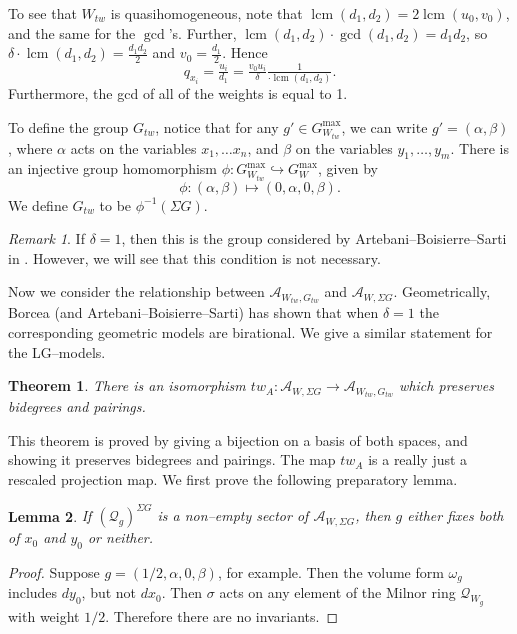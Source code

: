 \documentclass[10pt, letterpaper]{amsart}
\newtheorem{thm}{Theorem}%
\newtheorem{lem}[thm]{Lemma}
\theoremstyle{remark}
\newtheorem{rem}{Remark}[thm]
\newcommand{\sA}{\mathscr{A}}
\newcommand{\sQ}{\mathscr{Q}}
\newcommand{\tw}[1]{{#1}_{tw}}
\newcommand{\s}[1]{\Sigma #1}
\DeclareMathOperator{\lcm}{lcm}
\begin{document}
To see that $\tw{W}$ is quasihomogeneous, note that $\lcm(d_1,d_2)=2\lcm(u_0,v_0)$, and the same for the $\gcd$'s. Further,  $\lcm(d_1,d_2)\cdot\gcd(d_1,d_2)=d_1d_2$, so  $\delta\cdot\lcm(d_1,d_2)=\tfrac{d_1d_2}{2}$ and $v_0=\tfrac{d_1}{2}$. Hence
\[
q_{x_i}=\tfrac{u_i}{d_1}=\tfrac{v_0u_i}{\delta}\tfrac{1}{\cdot\lcm(d_1,d_2)}.
\]
Furthermore, the gcd of all of the weights is equal to 1. 


To define the group $\tw G$, notice that for any $g'\in G^{\max}_{\tw{W}}$,
we can write $g'=(\alpha, \beta)$, where $\alpha$ acts on the variables $x_1, \ldots x_n$, and $\beta$ on the variables $y_1, \ldots, y_m$. There is an injective group homomorphism $\phi:G_{\tw{W}}^{\max}\hookrightarrow G_{W}^{\max}$, given by 
\[
\phi: (\alpha,\beta)\mapsto (0,\alpha, 0, \beta). 
\]
We define $\tw{G}$ to be $\phi^{-1}(\s{G})$. \\

\begin{rem} If $\delta=1$, then this is the group considered by Artebani--Boisierre--Sarti in \cite{ABS}. However, we will see that this condition is not necessary. 
\end{rem}

Now we consider the relationship between $\sA_{\tw{W},\tw{G}}$ and $\sA_{W,\s{G}}$. Geometrically, Borcea (and Artebani--Boisierre--Sarti) has shown that when $\delta=1$ the corresponding geometric models are birational. We give a similar statement for the LG--models. 

\begin{thm}\label{t:twist}
There is an isomorphism $tw_A:\sA_{W,\s{G}}\to \sA_{ \tw{W}, \tw{G}}$ which preserves bidegrees and pairings. 
\end{thm}

This theorem is proved by giving a bijection on a basis of both spaces, and showing it preserves bidegrees and pairings. The map $tw_A$ is a really just a rescaled projection map. We first prove the following preparatory lemma. 

\begin{lem}\label{l:allornothing}
If $(\sQ_{g})^{\s{G}}$ is a non--empty sector of $\sA_{W,\s{G}}$, then $g$ either fixes both of $x_0$ and $y_0$ or neither. 
\end{lem}
\begin{proof}
Suppose $g=(1/2,\alpha, 0,\beta)$, for example. Then the volume form $\omega_g$ includes $dy_0$, but not $dx_0$. Then $\sigma$ acts on any element of the Milnor ring $\sQ_{W_g}$ with weight $1/2$. Therefore there are no invariants. 
\end{proof}
\end{document}
